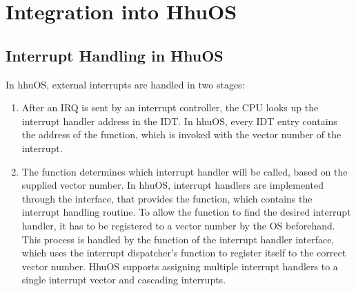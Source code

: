 %
%

\section{Integration into HhuOS}
\label{sec:apxhhuos}

\subsection{Interrupt Handling in HhuOS}
\label{subsec:apxcurrenthhuos}

In hhuOS, external interrupts are handled in two stages:

\begin{enumerate}
  \item After an IRQ is sent by an interrupt controller, the CPU looks up the interrupt handler address in the IDT\@.
        In hhuOS, every IDT entry contains the address of the  function, which is invoked with the vector number of the interrupt.
  \item The  function determines which interrupt handler will be called, based on the supplied vector number.
        In hhuOS, interrupt handlers are implemented through the  interface, that provides the  function, which contains the interrupt handling routine.
        To allow the  function to find the desired interrupt handler, it has to be registered to a vector number by the OS beforehand.
        This process is handled by the  function of the interrupt handler interface, which uses the interrupt dispatcher's  function to register itself to the correct vector number.
        HhuOS supports assigning multiple interrupt handlers to a single interrupt vector and cascading interrupts.
\end{enumerate}

